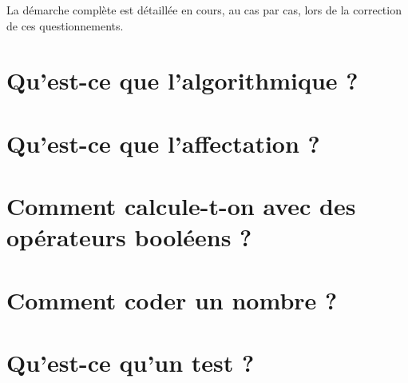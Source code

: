 \documentclass[11pt,a4paper,colorlinks,breaklinks]{article}
\begin{document}
La démarche complète est détaillée en cours, au cas par cas, lors de la correction
de ces questionnements.

\newpage
\section{Qu'est-ce que l'algorithmique ?}\label{sec:algo}
	
\newpage
\section{Qu'est-ce que l'affectation ?}\label{sec:affectation}
	
\newpage
\section{Comment calcule-t-on avec des opérateurs booléens ?}\label{sec:booleens}

\newpage
\section{Comment coder un nombre ?}\label{sec:codage}

\newpage
\section{Qu'est-ce qu'un test ?}\label{sec:tests}

\newpage
\end{document}
